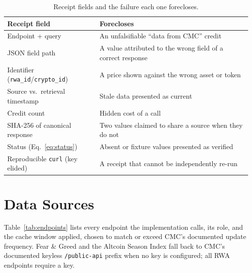 \documentclass[11pt]{article}
\newcommand{\code}[1]{\texttt{\small #1}}
\begin{document}
\begin{table}[t]
\centering\small
\begin{tabularx}{\linewidth}{@{}lX@{}}
\toprule
Receipt field & Forecloses\\
\midrule
Endpoint + query & An unfalsifiable ``data from CMC'' credit\\
JSON field path & A value attributed to the wrong field of a correct response\\
Identifier (\code{rwa\_id}/\code{crypto\_id}) & A price shown against the wrong asset or token\\
Source vs.\ retrieval timestamp & Stale data presented as current\\
Credit count & Hidden cost of a call\\
SHA-256 of canonical response & Two values claimed to share a source when they do not\\
Status (Eq.~\ref{eq:status}) & Absent or fixture values presented as verified\\
Reproducible \code{curl} (key elided) & A receipt that cannot be independently re-run\\
\bottomrule
\end{tabularx}
\caption{Receipt fields and the failure each one forecloses.}
\label{tab:receipt}
\end{table}

\section{Data Sources}

Table~\ref{tab:endpoints} lists every endpoint the implementation calls, its role, and the cache window applied, chosen to match or exceed CMC's documented update frequency. Fear \& Greed and the Altcoin Season Index fall back to CMC's documented keyless \code{/public-api} prefix when no key is configured; all RWA endpoints require a key.
\end{document}
